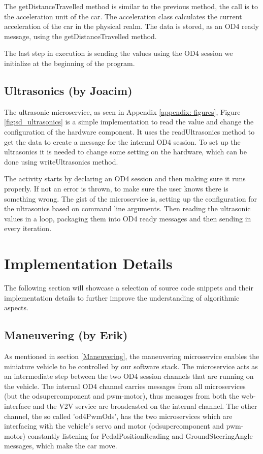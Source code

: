 \documentclass[12pt]{article}
\begin{document}
The getDistanceTravelled method is similar to the previous method, the call is to the acceleration unit of the car. The acceleration class calculates the current acceleration of the car in the physical realm.  The data is stored, as an OD4 ready message, using the getDistanceTravelled method.

The last step in execution is sending the values using the OD4 session we initialize at the beginning of the program.  

\subsection{Ultrasonics (by Joacim)}
The ultrasonic microservice, as seen in Appendix \ref{appendix: figures}, Figure \ref{fig:sd_ultrasonics} is a simple implementation to read the value and change the configuration of the hardware component. It uses the readUltrasonics method to get the data to create a message for the internal OD4 session. To set up the ultrasonics it is needed to change some setting on the hardware, which can be done using writeUltrasonics method. 

The activity starts by declaring an OD4 session and then making sure it runs properly. If not an error is thrown, to make sure the user knows there is something wrong. The gist of the microservice is, setting up the configuration for the ultrasonics based on command line arguments. Then reading the ultrasonic values in a loop, packaging them into OD4 ready messages and then sending in every iteration. 

\pagebreak

\section{Implementation Details}\label{implementation details}

The following section will showcase a selection of source code snippets and their implementation details to  further improve the understanding of algorithmic aspects. 
\par

\subsection{Maneuvering (by Erik)}
As mentioned in section \ref{Maneuvering}, the maneuvering microservice enables the miniature vehicle to be controlled by our software stack. The microservice acts as an intermediate step between the two OD4 session channels that are running on the vehicle. The internal OD4 channel carries messages from all microservices (but the odsupercomponent and pwm-motor), thus messages from both the web-interface and the V2V service are broadcasted on the internal channel. The other channel, the so called 'od4PwmOds', has the two microservices which are interfacing with the vehicle's servo and motor (odsupercomponent and pwm-motor) constantly listening for PedalPositionReading and GroundSteeringAngle messages, which make the car move. 
\end{document}
